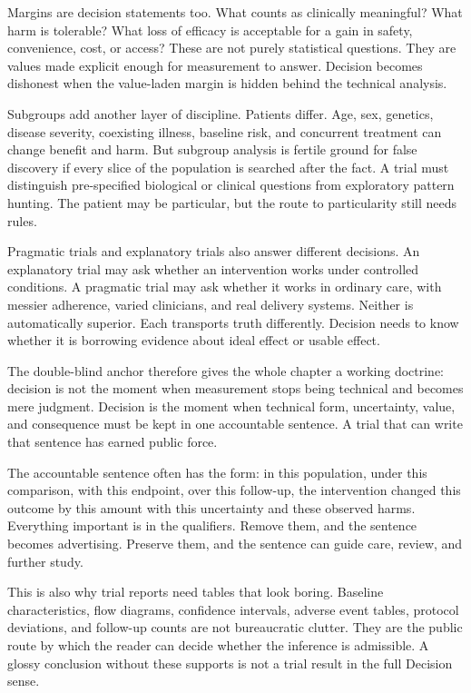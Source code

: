 Margins are decision statements too. What counts as clinically meaningful?
What harm is tolerable? What loss of efficacy is acceptable for a gain in
safety, convenience, cost, or access? These are not purely statistical
questions. They are values made explicit enough for measurement to answer.
Decision becomes dishonest when the value-laden margin is hidden behind the
technical analysis.

Subgroups add another layer of discipline. Patients differ. Age, sex,
genetics, disease severity, coexisting illness, baseline risk, and concurrent
treatment can change benefit and harm. But subgroup analysis is fertile
ground for false discovery if every slice of the population is searched after
the fact. A trial must distinguish pre-specified biological or clinical
questions from exploratory pattern hunting. The patient may be particular,
but the route to particularity still needs rules.

Pragmatic trials and explanatory trials also answer different decisions. An
explanatory trial may ask whether an intervention works under controlled
conditions. A pragmatic trial may ask whether it works in ordinary care, with
messier adherence, varied clinicians, and real delivery systems. Neither is
automatically superior. Each transports truth differently. Decision needs to
know whether it is borrowing evidence about ideal effect or usable effect.

The double-blind anchor therefore gives the whole chapter a working doctrine:
decision is not the moment when measurement stops being technical and becomes
mere judgment. Decision is the moment when technical form, uncertainty, value,
and consequence must be kept in one accountable sentence. A trial that can
write that sentence has earned public force.

The accountable sentence often has the form: in this population, under this
comparison, with this endpoint, over this follow-up, the intervention changed
this outcome by this amount with this uncertainty and these observed harms.
Everything important is in the qualifiers. Remove them, and the sentence
becomes advertising. Preserve them, and the sentence can guide care, review,
and further study.

This is also why trial reports need tables that look boring. Baseline
characteristics, flow diagrams, confidence intervals, adverse event tables,
protocol deviations, and follow-up counts are not bureaucratic clutter. They
are the public route by which the reader can decide whether the inference is
admissible. A glossy conclusion without these supports is not a trial result
in the full Decision sense.

